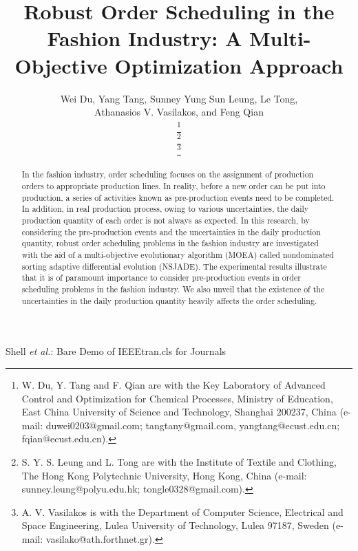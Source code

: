 \documentclass[journal]{IEEEtran}
\theoremstyle{definition}
\begin{document}
%
\title{Robust Order Scheduling in the Fashion Industry: A Multi-Objective Optimization Approach}

\author{Wei Du,
        Yang Tang,
        Sunney Yung Sun Leung,
        Le Tong, \\
        Athanasios V. Vasilakos,
        and Feng Qian\\

\thanks{W. Du, Y. Tang and F. Qian are with the Key Laboratory of Advanced Control and Optimization for Chemical Processes, Ministry of Education, East China University of Science and Technology, Shanghai 200237, China (e-mail: duwei0203@gmail.com; tangtany@gmail.com, yangtang@ecust.edu.cn; fqian@ecust.edu.cn).}

\thanks{S. Y. S. Leung and L. Tong are with the Institute of Textile and Clothing, The Hong Kong Polytechnic University, Hong Kong, China (e-mail: sunney.leung@polyu.edu.hk; tongle0328@gmail.com).}

\thanks{A. V. Vasilakos is with the Department of Computer Science, Electrical and Space Engineering, Lulea University of Technology, Lulea 97187, Sweden (e-mail: vasilako@ath.forthnet.gr).}}


%
{Shell \MakeLowercase{\textit{et al.}}: Bare Demo of IEEEtran.cls
for Journals}


\maketitle


\begin{abstract}
In the fashion industry, order scheduling focuses on the assignment of production orders to appropriate production lines. In reality, before a new order can be put into production, a series of activities known as pre-production events need to be completed. In addition, in real production process, owing to various uncertainties, the daily production quantity of each order is not always as expected. In this research, by considering the pre-production events and the uncertainties in the daily production quantity, robust order scheduling problems in the fashion industry are investigated with the aid of a multi-objective evolutionary algorithm (MOEA) called nondominated sorting adaptive differential evolution (NSJADE).
The experimental results illustrate that it is of paramount importance to consider pre-production events in order scheduling problems in the fashion industry. We also unveil that the existence of the uncertainties in the daily production quantity heavily affects the order scheduling.
\end{abstract}
\end{document}
